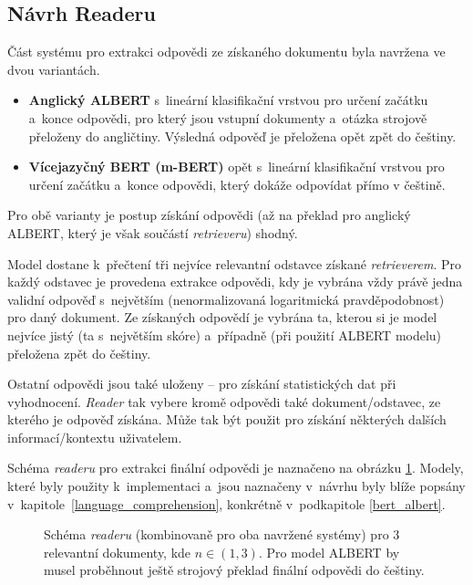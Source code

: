 \subsection{Návrh Readeru}
Část systému pro extrakci odpovědi ze získaného dokumentu byla navržena ve dvou variantách.
\begin{itemize}
    \item \textbf{Anglický ALBERT} s~lineární klasifikační vrstvou pro určení začátku a~konce odpovědi, pro který jsou vstupní dokumenty a~otázka strojově přeloženy do angličtiny. Výsledná odpověď je přeložena opět zpět do češtiny.
    \item \textbf{Vícejazyčný BERT (m-BERT)} opět s~lineární klasifikační vrstvou pro určení začátku a~konce odpovědi, který dokáže odpovídat přímo v češtině.
\end{itemize}
Pro obě varianty je postup získání odpovědi (až na překlad pro anglický ALBERT, který je však součástí \emph{retrieveru}) shodný.\par
Model dostane k~přečtení tři nejvíce relevantní odstavce získané \emph{retrieverem}. Pro každý odstavec je provedena extrakce odpovědi, kdy je vybrána vždy právě jedna validní odpověď s~největším  (nenormalizovaná logaritmická pravděpodobnost) pro daný dokument. Ze získaných odpovědí je vybrána ta, kterou si je model nejvíce jistý (ta s~největším skóre) a~případně (při použití ALBERT modelu) přeložena zpět do češtiny.\par
\noindent Ostatní odpovědi jsou také uloženy -- pro získání statistických dat při vyhodnocení. \emph{Reader} tak vybere kromě odpovědi také dokument/odstavec, ze kterého je odpověď získána. Může tak být použit pro získání některých dalších informací/kontextu uživatelem.\par
Schéma \emph{readeru} pro extrakci finální odpovědi je naznačeno na obrázku \ref{reader_schema}. Modely, které byly použity k~implementaci a~jsou naznačeny v~návrhu byly blíže popsány v~kapitole~\ref{language_comprehension}, konkrétně v~podkapitole \ref{bert_albert}.

\begin{figure}[hbt]
	\centering
	\caption{Schéma \emph{readeru} (kombinovaně pro oba navržené systémy) pro 3 relevantní dokumenty, kde $n \in (1,3)$. Pro model ALBERT by musel proběhnout ještě strojový překlad finální odpovědi do češtiny.}
	\label{reader_schema}
\end{figure}

